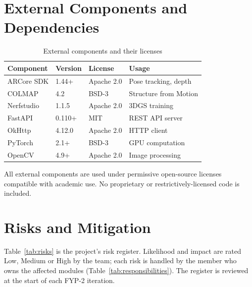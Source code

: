 \section{External Components and Dependencies}

\begin{table}[htbp]
\centering
\small
\caption{External components and their licenses}
\label{tab:dependencies}
\begin{tabular}{p{3.5cm}p{2cm}p{2.5cm}p{3cm}}
\toprule
\textbf{Component} & \textbf{Version} & \textbf{License} & \textbf{Usage} \\
\midrule
ARCore SDK & 1.44+ & Apache 2.0 & Pose tracking, depth \\
COLMAP & 4.2 & BSD-3 & Structure from Motion \\
Nerfstudio & 1.1.5 & Apache 2.0 & 3DGS training \\
FastAPI & 0.110+ & MIT & REST API server \\
OkHttp & 4.12.0 & Apache 2.0 & HTTP client \\
PyTorch & 2.1+ & BSD-3 & GPU computation \\
OpenCV & 4.9+ & Apache 2.0 & Image processing \\
\bottomrule
\end{tabular}
\end{table}

All external components are used under permissive open-source licenses compatible with academic use. No proprietary or restrictively-licensed code is included.

\section{Risks and Mitigation}

Table~\ref{tab:risks} is the project's risk register. Likelihood and impact are rated Low, Medium or High by the team; each risk is handled by the member who owns the affected modules (Table~\ref{tab:responsibilities}). The register is reviewed at the start of each FYP-2 iteration.

